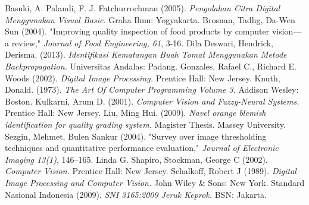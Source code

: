 \documentclass[laporan.tex]{subfiles}
\begin{document}
\begin{thebibliography}{99}
 Basuki, A. Palandi, F. J. Fatchurrochman (2005). \textit{Pengolahan Citra Digital Menggunakan Visual Basic.} Graha Ilmu: Yogyakarta.
 Brosnan, Tadhg, Da-Wen Sun (2004). "Improving quality inspection of food products by computer vision––a review," \textit{Journal of Food Engineering, 61}, 3-16.
 Dila Deswari, Hendrick, Derisma. (2013). \textit{Identifikasi Kematangan Buah Tomat Menggunakan Metode Backpropagation.} Universitas Andalas: Padang.
 Gonzales, Rafael C., Richard E. Woods (2002). \textit{Digital Image Processing.} Prentice Hall: New Jersey.
 Knuth, Donald. (1973). \textit{The Art Of Computer Programming Volume 3.} Addison Wesley: Boston.
 Kulkarni, Arum D. (2001). \textit{Computer Vision and Fuzzy-Neural Systems.} Prentice Hall: New Jersey.
 Liu, Ming Hui. (2009). \textit{Navel orange blemish identification for quality grading system.} Magister Thesis. Massey University.
 Sezgin, Mehmet, Bulen Sankur (2004). "Survey over image thresholding techniques and quantitative performance evaluation," \textit{Journal of Electronic Imaging 13(1)}, 146–165.
  Linda G. Shapiro, Stockman, George C (2002). \textit{Computer Vision.} Prentice Hall: New Jersey. 
 Schalkoff, Robert J (1989). \textit{Digital Image Processing and Computer Vision.} John Wiley \& Sons: New York.
 Standard Nasional Indonesia (2009). \textit{SNI 3165:2009 Jeruk Keprok.} BSN: Jakarta.
\end{thebibliography}
\end{document}

